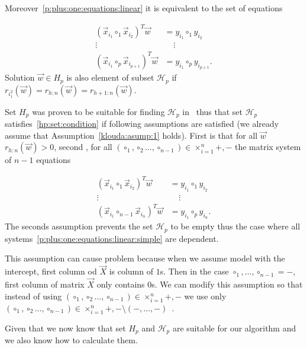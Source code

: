 Moreover~\eqref{p:plus:one:equations:linear} it is equivalent to the set of equations

\begin{align} 
    (\vec{x}_{i_1} \circ_1 \vec {x}_{i_2} )^T \vec{w} &= y_{i_1} \circ_1 y_{i_2} \label{p:plus:one:equations:linear:simple}   \\
    \vdots \ \ \  & \ \ \ \  \ \vdots  \nonumber \\ 
    (\vec{x}_{i_1} \circ_p \vec {x}_{i_{p+1}} )^T \vec{w} &= y_{i_1} \circ_p y_{i_{p+1}}. \nonumber 
\end{align}
Solution $\vec{w} \in H_p$ is also element of subset $\mathcal{H}_p$ if $r_{i_1^2}(\vec{w}) = r_{h:n}(\vec{w}) = r_{h+1:n}(\vec{w})$.

Set $H_p$ was proven to be suitable for finding $\mathcal{H}_p$ in~\cite{klouda2015exact} thus that set $\mathcal{H}_p$ satisfies~\eqref{hp:set:condition} if following assumptions are satisfied (we already assume that Assumption~\ref{klouda:asump:1} holds). First is that for all $\vec{w}$ $r_{h:n}(\vec{w}) > 0$, second , for all 
$(\circ_1,\circ_2 \ldots,  \circ_{n-1}) \in \times^n_{i=1} {+, -}$ the matrix system of $n-1$ equations

\begin{align} 
    (\vec{x}_{i_1} \circ_1 \vec {x}_{i_2} )^T \vec{w} &= y_{i_1} \circ_1 y_{i_2} \label{p:plus:one:equations:linear:simple:to:n}   \\
    \vdots \ \ \  & \ \ \ \  \ \vdots  \nonumber \\ 
    (\vec{x}_{i_1} \circ_{n-1} \vec {x}_{i_{n}} )^T \vec{w} &= y_{i_1} \circ_p y_{i_{n}}. \nonumber
\end{align}
The seconds assumption prevents the set $\mathcal{H}_p$ to be empty thus the case where all systems~\eqref{p:plus:one:equations:linear:simple} are dependent. 

This assumption can cause problem because when we assume model with the intercept, first column od $\vec{X}$ is column of $1$s. Then in the case  $\circ_1,\ldots,  \circ_{n-1} = -$, first column of matrix $\vec{X}$ only contains $0$s. We can modify this assumption so that instead of using $(\circ_1,\circ_2 \ldots,  \circ_{n-1}) \in \times^n_{i=1} {+, -}$ we use only $(\circ_1,\circ_2 \ldots,  \circ_{n-1}) \in \times^n_{i=1} {+, -} \setminus {(-, \ldots, -)}$~\cite{klouda2015exact}. 

Given that we now know that set $H_p$ and $\mathcal{H}_p$ are suitable for our algorithm and we also know how to calculate them.

